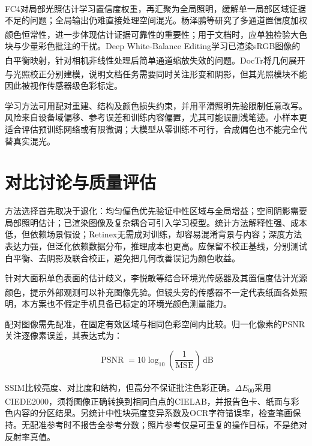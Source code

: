 \documentclass[UTF8,a4paper,zihao=5,fontset=none]{ctexart}
\begin{document}
FC4对局部光照估计学习置信度权重，再汇聚为全局照明\textsuperscript{\cite{hu2017fc4}}，缓解单一局部区域证据不足的问题；全局输出仍难直接处理空间混光。杨泽鹏等研究了多通道置信度加权颜色恒常性\textsuperscript{\cite{yang2021confidence}}，进一步体现估计证据可靠性的重要性；用于文档时，应单独检验大色块与少量彩色批注的干扰。Deep White-Balance Editing学习已渲染sRGB图像的白平衡映射\textsuperscript{\cite{afifi2020}}，针对相机非线性处理后简单通道缩放失效的问题。DocTr将几何展开与光照校正分别建模\textsuperscript{\cite{feng2021doctr}}，说明文档任务需要同时关注形变和阴影，但其光照模块不能因此被视作传感器级色彩标定。


学习方法可用配对重建、结构及颜色损失约束，并用平滑照明先验限制任意改写。风险来自设备域偏移、参考误差和训练内容偏置，尤其可能误删浅笔迹。小样本更适合评估预训练网络或有限微调；大模型从零训练不可行，合成偏色也不能完全代替真实混光。


\section{对比讨论与质量评估}

方法选择首先取决于退化：均匀偏色优先验证中性区域与全局增益；空间阴影需要局部照明估计；已渲染图像及复杂耦合可引入学习模型。统计方法解释性强、成本低，但依赖场景假设；Retinex无需成对训练，却容易混淆背景与内容；深度方法表达力强，但泛化依赖数据分布，推理成本也更高。应保留不校正基线，分别测试白平衡、去阴影及联合校正，避免把几何改善误记为颜色收益。


针对大面积单色表面的估计歧义，李悦敏等结合环境光传感器及其置信度估计光源颜色\textsuperscript{\cite{li2023sensor}}，提示外部观测可以补充图像先验。但镜头旁的传感器不一定代表纸面各处照明，本方案也不假定手机具备已标定的环境光颜色测量能力。


配对图像需先配准，在固定有效区域与相同色彩空间内比较。归一化像素的PSNR关注逐像素误差，其表达式为：


\begin{equation}
\operatorname{PSNR}=10\log_{10}\!\left(\frac{1}{\operatorname{MSE}}\right)\,\mathrm{dB}
\label{eq:2}
\end{equation}

SSIM比较亮度、对比度和结构\textsuperscript{\cite{wang2004}}，但高分不保证批注色彩正确。$\Delta E_{00}$采用CIEDE2000\textsuperscript{\cite{sharma2005}}，须将图像正确转换到相同白点的CIELAB，并报告色卡、纸面与彩色内容的分区结果。另统计中性块亮度变异系数及OCR字符错误率，检查笔画保持。无配准参考时不报告全参考分数；照片参考仅是可重复的操作目标，不是绝对反射率真值。
\end{document}
